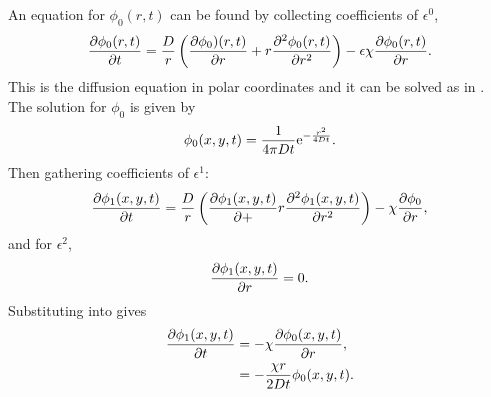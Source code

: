 %
An equation for $\phi_0(r,t)$ can be found by collecting coefficients of $\epsilon^0$,
%
\begin{equation}
  \frac{\partial \phi_0(r,t)}{\partial t} = \frac{D}{r} \left(\frac{\partial \phi_0)(r,t)}{\partial r} + r\frac{\partial^2 \phi_0(r,t)}{\partial r^2}\right) - \epsilon\chi \frac{\partial \phi_0(r,t)}{\partial r}.
  \label{eqn:diffusion_eps0}
\end{equation}
%
This is the diffusion equation in polar coordinates and it can be solved as in . The solution for $\phi_0$ is given by
%
\begin{equation}
  \phi_0(x,y,t) = \frac{1}{4\pi Dt}\mathrm{e}^{-\frac{r^2}{4Dt}}.\\
  \label{eqn:phi_0}
\end{equation}
%
Then gathering coefficients of $\epsilon^1$:
%
\begin{equation}
\frac{\partial \phi_1(x,y,t)}{\partial t} = \frac{D}{r}\left(\frac{\partial \phi_1(x,y,t)}{\partial +} r \frac{\partial^2 \phi_1(x,y,t)}{\partial r^2}\right) - \chi\frac{\partial \phi_0}{\partial r},
\label{eqn:eps1}
\end{equation}
%
and for $\epsilon^2$,
%
\begin{equation}
\frac{\partial \phi_1(x,y,t)}{\partial r} = 0 .
\label{eqn:eps2}
\end{equation}
%
Substituting  into  gives
%
\begin{equation}
\begin{split}
  \frac{\partial \phi_1(x,y,t)}{\partial t} &= - \chi\frac{\partial \phi_0(x,y,t)}{\partial r}, \\
                       &= - \frac{\chi r}{2Dt} \phi_0(x,y,t) .
\end{split}
\end{equation}
